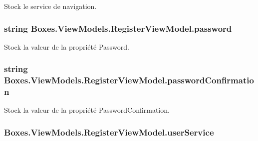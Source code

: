 Stock le service de navigation. 

\subsubsection[{\texorpdfstring{password}{password}}]{\setlength{\rightskip}{0pt plus 5cm}string Boxes.\+View\+Models.\+Register\+View\+Model.\+password\hspace{0.3cm}{\ttfamily [private]}}\hypertarget{class_boxes_1_1_view_models_1_1_register_view_model_a3aead86ad1596454c581f6cc9fd02c76}{}\label{class_boxes_1_1_view_models_1_1_register_view_model_a3aead86ad1596454c581f6cc9fd02c76}


Stock la valeur de la propriété {\ttfamily Password}. 

\subsubsection[{\texorpdfstring{password\+Confirmation}{passwordConfirmation}}]{\setlength{\rightskip}{0pt plus 5cm}string Boxes.\+View\+Models.\+Register\+View\+Model.\+password\+Confirmation\hspace{0.3cm}{\ttfamily [private]}}\hypertarget{class_boxes_1_1_view_models_1_1_register_view_model_a034d4b47eaa785324c2dd5f665feef66}{}\label{class_boxes_1_1_view_models_1_1_register_view_model_a034d4b47eaa785324c2dd5f665feef66}


Stock la valeur de la propriété {\ttfamily Password\+Confirmation}. 

\subsubsection[{\texorpdfstring{user\+Service}{userService}}]{ Boxes.\+View\+Models.\+Register\+View\+Model.\+user\+Service\hspace{0.3cm}{\ttfamily [private]}}\hypertarget{class_boxes_1_1_view_models_1_1_register_view_model_acb915d2826a23f07e311c904ddf6fac9}{}\label{class_boxes_1_1_view_models_1_1_register_view_model_acb915d2826a23f07e311c904ddf6fac9}


